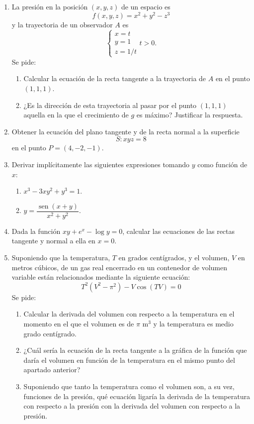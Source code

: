 \documentclass[a4paper,titlepage]{article}
\DeclareMathOperator{\sen}{sen}
\theoremstyle{solution}
\begin{document}
\begin{enumerate}[resume, leftmargin=*]
\item La presión en la posición $(x,y,z)$ de un espacio es 
\[
f(x,y,z)= x^2+y^2-z^3
\]
y la trayectoria de un observador $A$ es 
\[
\begin{cases}
x=t\\
y=1\\
z=1/t
\end{cases}
t>0.
\]
Se pide:
\begin{enumerate}
\item Calcular la ecuación de la recta tangente a la trayectoria de $A$ en el punto $(1,1,1)$.
\item ¿Es la dirección de esta trayectoria al pasar por el punto $(1,1,1)$ aquella en la que el crecimiento de $g$
es máximo? 
Justificar la respuesta. 
\end{enumerate}

\item Obtener la ecuación del plano tangente y de la recta normal a la superficie 
\[
S:xyz=8
\]
en el punto $P=(4,-2,-1)$.

\item Derivar implícitamente las siguientes expresiones tomando $y$ como función de $x$:
\begin{multicols}{2}
\begin{enumerate}
\item $x^3-3xy^2+y^3=1$.
\item $y=\dfrac{\sen(x+y)}{x^2+y^2}$.
\end{enumerate}
\end{multicols}

\item Dada la función $xy+e^x-\log y=0$, calcular las ecuaciones de las rectas tangente y normal a ella en $x=0$.

\item Suponiendo que la temperatura, $T$ en grados centígrados, y el volumen, $V$ en metros cúbicos, de un gas real encerrado en un contenedor de volumen variable están relacionados mediante la siguiente ecuación:
\[
T^2 \left( {V^2  - \pi ^2 } \right) - V\cos \left( {TV} \right) = 0
\]
Se pide:
\begin{enumerate}
\item Calcular la derivada del volumen con respecto a la temperatura en el momento en el que el volumen es de $\pi$ m$^3$ y la temperatura es medio grado centígrado.

\item ¿Cuál sería la ecuación de la recta tangente a la gráfica de la función que daría el volumen en función de la temperatura en el mismo punto del apartado anterior?
\item Suponiendo que tanto la temperatura como el volumen son, a su vez, funciones de la presión, qué ecuación ligaría la derivada de la temperatura con respecto a la presión con la derivada del volumen con respecto a la presión.
\end{enumerate}


\end{enumerate}
\end{document}

